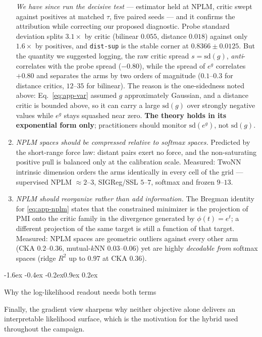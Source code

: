 \documentclass{article}
\makeatletter
\renewcommand\subsection{\@startsection{subsection}{2}{\z@}%
  {-1.6ex \@plus -0.4ex \@minus -0.2ex}{0.9ex \@plus 0.2ex}%
  {\normalsize\bf\raggedright}}
\makeatother
\begin{document}
\begin{enumerate}
\emph{We have since run the decisive test} --- estimator held at NPLM, critic
swept against positives at matched $\tau$, five paired seeds --- and it
confirms the attribution while correcting our proposed diagnostic. Probe
standard deviation splits $3.1\times$ by critic (bilinear $0.055$, distance
$0.018$) against only $1.6\times$ by positives, and \texttt{dist-sup} is the
stable corner at $0.8366\pm0.0125$. But the quantity we suggested logging,
the raw critic spread $s=\mathrm{sd}(g)$, \emph{anti}-correlates with the probe
spread ($-0.80$), while the spread of $e^{g}$ correlates $+0.80$ and separates
the arms by two orders of magnitude ($0.1$--$0.3$ for distance critics,
$12$--$35$ for bilinear). The reason is the one-sidedness noted above:
Eq.~\eqref{eq:app-var} assumed $g$ approximately Gaussian, and a distance
critic is bounded above, so it can carry a large $\mathrm{sd}(g)$ over
strongly negative values while $e^{g}$ stays squashed near zero. \textbf{The
theory holds in its exponential form only}; practitioners should monitor
$\mathrm{sd}(e^{g})$, not $\mathrm{sd}(g)$.

\item \emph{NPLM spaces should be compressed relative to softmax spaces.}
Predicted by the short-range force law: distant pairs exert no force, and the
non-saturating positive pull is balanced only at the calibration scale.
Measured: TwoNN intrinsic dimension orders the arms identically in every cell of
the grid --- supervised NPLM $\approx2$--$3$, SIGReg/SSL $5$--$7$, softmax and
frozen $9$--$13$.

\item \emph{NPLM should reorganize rather than add information.} The Bregman
identity for \eqref{eq:app-nplm} states that the constrained minimizer is the
projection of $\mathrm{PMI}$ onto the critic family in the divergence generated
by $\phi(t)=e^{t}$; a different projection of the same target is still a
function of that target. Measured: NPLM spaces are geometric outliers against
every other arm (CKA $0.2$--$0.36$, mutual-$k$NN $0.03$--$0.06$) yet are highly
\emph{decodable from} softmax spaces (ridge $R^2$ up to $0.97$ at CKA $0.36$).
\end{enumerate}

\subsection{Why the log-likelihood readout needs both terms}

Finally, the gradient view sharpens why neither objective alone delivers an
interpretable likelihood surface, which is the motivation for the hybrid used
throughout the campaign.
\end{document}
